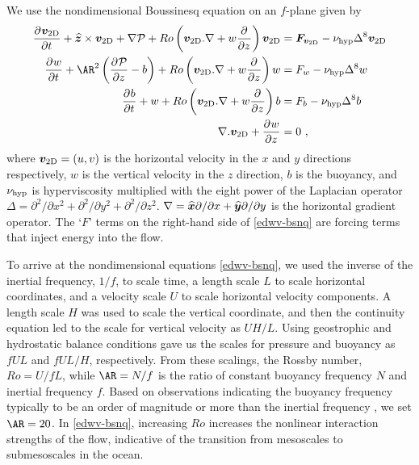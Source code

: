 \documentclass[../Rajarshi-thesis-draft.tex]{subfiles}
\begin{document}
We use the nondimensional Boussinesq equation on an $f$-plane given by
\begin{subequations}
 \label{edwv-bsnq}
 \begin{align}
 \Dp{\vec{v}_{\rm 2D}}{t}{} + \hat{\vec{z}} \times \vec{v}_{\rm 2D} + \del \mathcal{P} + Ro \left( \vec{v}_{\rm 2D}.\del + w\Dp{}{z}{}\right)\vec{v}_{\rm 2D} &= \vec{F}_{\vec{v}_{\rm 2D}}- \nu_{\rm hyp}\Delta^{8} \vec{v}_{\rm 2D}\\
 \Dp{w}{t}{} +\AR^2 \left( \Dp{\mathcal{P}}{z}{}-b\right) + Ro \left( \vec{v}_{\rm 2D}.\del + w\Dp{}{z}{}\right) w &= F_w - \nu_{\rm hyp}\Delta^{8} w\\
 \Dp{b}{t}{} + w + Ro \left( \vec{v}_{\rm 2D}.\del + w\Dp{}{z}{}\right)b&= F_b -\nu_{\rm hyp}\Delta^{8} b \\
 \del. \vec{v}_{\rm 2D} + \Dp{w}{z}{} &= 0 \ ,
 \end{align}
\end{subequations}
where $\vec{v}_{\rm 2D} = (u,v)$ is the horizontal velocity in the $x$ and $y$ directions respectively, $w$ is the vertical velocity in the $z$ direction, $b$ is the buoyancy, and $\nu_{\rm hyp}$ is hyperviscosity multiplied with the eight power of the Laplacian operator $\Delta = \partial^2/\partial x^2 + \partial^2/\partial y^2 + \partial^2/\partial z^2$. $\del = \hat{\vec{x}}\partial/\partial x +\hat{\vec{y}} \partial/\partial y$ is the horizontal gradient operator. The `$F$' terms on the right-hand side of \eqref{edwv-bsnq} are forcing terms that inject energy into the flow. 


To arrive at the nondimensional equations \eqref{edwv-bsnq}, we used the inverse of the inertial frequency, $1/f$, to scale time, a length scale $L$ to scale horizontal coordinates, and a velocity scale $U$ to scale horizontal velocity components. A length scale $H$ was used to scale the vertical coordinate, and then the continuity equation led to the scale for vertical velocity as $UH/L$. Using geostrophic and hydrostatic balance conditions gave us the scales for pressure and buoyancy as $fUL$ and $fUL/H$, respectively. From these scalings, the Rossby number, $Ro=U/fL$, while $\AR=N/f$ is the ratio of constant buoyancy frequency $N$ and inertial frequency $f$. Based on observations indicating the buoyancy frequency typically to be an order of magnitude or more than the inertial frequency \citep{Emery_etal_1984, Li_etal_2020}, we set $\AR=20$. In \eqref{edwv-bsnq}, increasing   $Ro$ increases the nonlinear interaction strengths of the flow, indicative of the transition from mesoscales to submesoscales in the ocean. %
\end{document}

